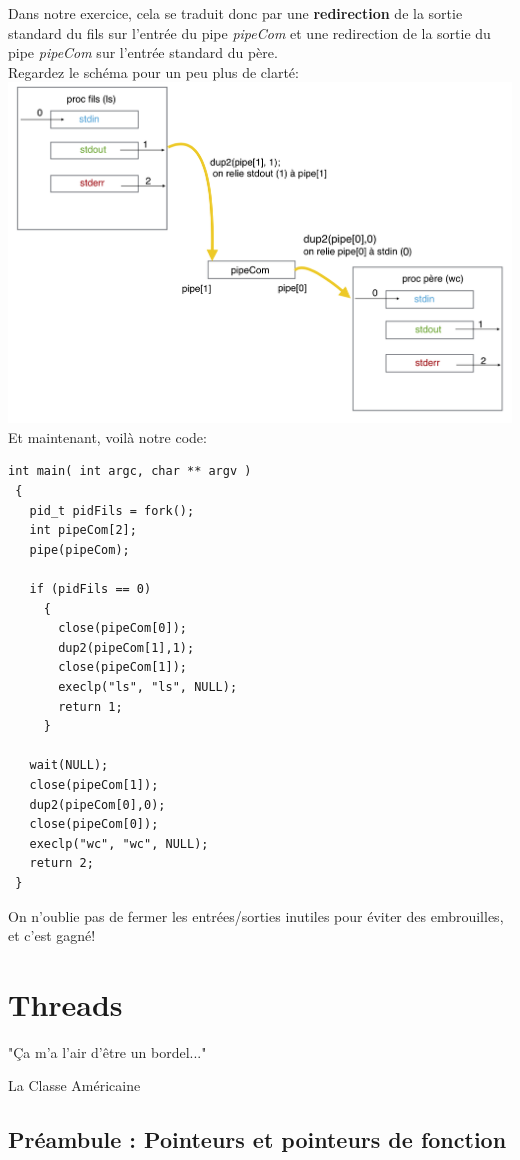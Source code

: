 \documentclass{report}
\begin{document}
Dans notre exercice, cela se traduit donc par une \textbf{redirection} de la sortie standard du fils sur l'entrée du pipe \emph{pipeCom} et une redirection de la sortie du pipe \emph{pipeCom} sur l'entrée standard du père.\\ Regardez le schéma pour un peu plus de clarté:\\
\includegraphics[scale=0.25]{dup2}
\\ Et maintenant, voilà notre code:
\begin{lstlisting}
int main( int argc, char ** argv )
 {
   pid_t pidFils = fork();
   int pipeCom[2];
   pipe(pipeCom);

   if (pidFils == 0)
     {
       close(pipeCom[0]);
       dup2(pipeCom[1],1);
       close(pipeCom[1]);
       execlp("ls", "ls", NULL);
       return 1;
     }

   wait(NULL);
   close(pipeCom[1]);
   dup2(pipeCom[0],0);
   close(pipeCom[0]);
   execlp("wc", "wc", NULL);
   return 2;
 }
\end{lstlisting}
On n'oublie pas de fermer les entrées/sorties inutiles pour éviter des embrouilles, et c'est gagné!




\chapter{Threads}
\epigraph{"Ça m'a l'air d'être un bordel..."}{La Classe Américaine}

\section{Préambule : Pointeurs et pointeurs de fonction}
\end{document}
